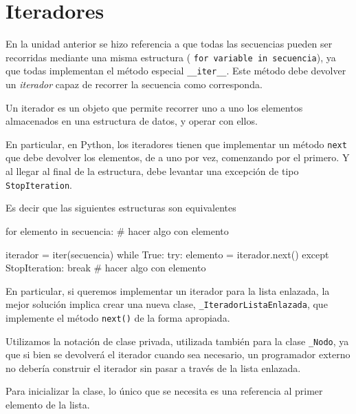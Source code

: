 \section{Iteradores}

En la unidad anterior se hizo referencia a que todas las secuencias
pueden ser recorridas mediante una misma estructura (
\lstinline!for variable in secuencia!), ya que todas implementan el método
especial \lstinline!__iter__!.  Este método debe devolver un {\it iterador}
capaz de recorrer la secuencia como corresponda.

\begin{observacion}
Un iterador es un objeto que permite recorrer uno a uno los elementos
almacenados en una estructura de datos, y operar con ellos.
\end{observacion}

En particular, en Python, los iteradores tienen que implementar un método
\lstinline!next! que debe devolver los elementos, de a uno por vez,
comenzando por el primero.  Y al llegar al final de la estructura, debe
levantar una excepción de tipo \lstinline!StopIteration!.

Es decir que las siguientes estructuras son equivalentes
\begin{codigo-python-sn}
for elemento in secuencia:
	# hacer algo con elemento
\end{codigo-python-sn}

\begin{codigo-python-sn}
iterador = iter(secuencia)
while True:
    try:
        elemento = iterador.next()
    except StopIteration:
        break
    # hacer algo con elemento
\end{codigo-python-sn}

En particular, si queremos implementar un iterador para la lista enlazada,
la mejor solución implica crear una nueva clase,
\lstinline!_IteradorListaEnlazada!, que implemente el método
\lstinline!next()! de la forma apropiada.

\begin{atencion}
Utilizamos la notación de clase privada, utilizada también para la clase
\lstinline!_Nodo!, ya que si bien se devolverá el iterador cuando sea
necesario, un programador externo no debería construir el iterador sin
pasar a través de la lista enlazada.
\end{atencion}

Para inicializar la clase, lo único que se necesita es una referencia al
primer elemento de la lista.  

